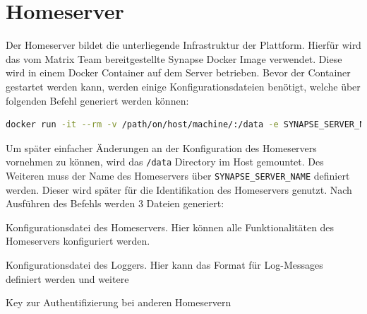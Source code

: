     \section{Homeserver}\label{sec:homeserver}
    Der Homeserver bildet die unterliegende Infrastruktur der Plattform.
    Hierfür wird das vom Matrix Team bereitgestellte Synapse Docker Image verwendet.
    Diese wird in einem Docker Container auf dem Server betrieben.
    Bevor der Container gestartet werden kann, werden einige Konfigurationsdateien benötigt, welche über folgenden Befehl generiert werden können:
    \begin{lstlisting}[language=bash,label={lst:synapse-generate}]
docker run -it --rm -v /path/on/host/machine/:/data -e SYNAPSE_SERVER_NAME=my.matrix.host -e SYNAPSE_REPORT_STATS=yes matrixdotorg/synapse:latest generate
    \end{lstlisting}
    Um später einfacher Änderungen an der Konfiguration des Homeservers vornehmen zu können, wird das \texttt{/data} Directory im Host gemountet.
    Des Weiteren muss der Name des Homeservers über \texttt{SYNAPSE\_SERVER\_NAME} definiert werden.
    Dieser wird später für die Identifikation des Homeservers genutzt.
    Nach Ausführen des Befehls werden 3 Dateien generiert:
    \begin{description}[leftmargin=!,labelwidth=4cm]
        \item [homeserver.yaml] Konfigurationsdatei des Homeservers. Hier können alle Funktionalitäten des Homeservers konfiguriert werden.
        \item [my.matrix.host.log.config] Konfigurationsdatei des Loggers. Hier kann das Format für Log-Messages definiert werden und weitere
        \item [my.matrix.host.signing.key] Key zur Authentifizierung bei anderen Homeservern
    \end{description}

